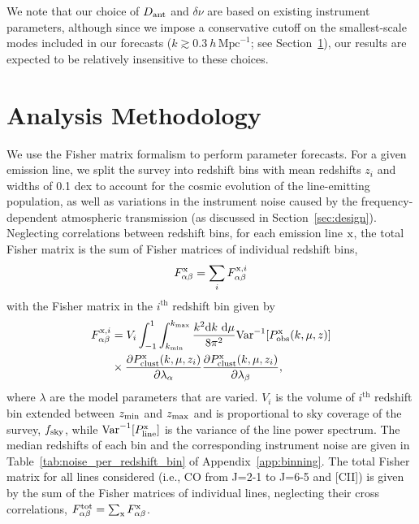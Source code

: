 \documentclass[twocolumn]{aastex631}
\newcommand{\be}{\begin{equation}}
\newcommand{\ee}{\end{equation}}
\begin{document}
We note that our choice of $D_{\rm ant}$ and $\delta\nu$ are based on existing instrument parameters, although since we impose a conservative cutoff on the smallest-scale modes included in our forecasts ($k\gtrsim0.3\ h\,\textrm{Mpc}^{-1}$; see Section~\ref{sec:Fisher}), our results are expected to be relatively insensitive to these choices.  \vspace{-.05in} \\


\section{Analysis Methodology}\label{sec:Fisher}

We use the Fisher matrix formalism to perform parameter forecasts. For a given emission line, we split the survey into redshift bins with mean redshifts $z_i$ and widths of 0.1 dex to account for the cosmic evolution of the line-emitting population, as well as variations in the instrument noise caused by the frequency-dependent atmospheric transmission (as discussed in Section~\ref{sec:design}). Neglecting correlations between redshift bins, for each emission line $\rm x$, the total Fisher matrix is the sum of Fisher matrices of individual redshift bins,
\be
F_{\alpha \beta}^{\rm x} = \sum_i F_{\alpha\beta}^{{\rm x},i}
\ee
with the Fisher matrix in the $i^{\text{th}}$ redshift bin given by
\begin{align}\label{eq:Fisher_single}
F_{\alpha\beta}^{{\rm x},i} &=  V_i \int_{-1}^1\int_{k_{\rm min}}^ {k_{\rm max}}  \frac{ k^2 {\rm d}k \ {\rm d}\mu  }{8 \pi^2} {\rm Var}^{-1}[P_{\rm obs}^{\rm x}(k,\mu,z)] \nonumber \\
&\times \frac{\partial P_{\rm clust}^{\rm x}(k,\mu,z_i)}{\partial { \lambda}_\alpha } \frac{\partial P_{\rm clust}^{\rm x}(k,\mu,z_i)}{\partial {\lambda}_\beta } ,
\end{align}
where $\lambda$ are the model parameters that are varied. $V_i$ is the volume of $i^{\text{th}}$ redshift bin extended between $z_{\rm min}$ and $z_{\rm max}$ and is proportional to sky coverage of the survey, $f_{\rm sky}$, while ${\rm Var}^{-1}[P_{\rm line}^{\rm x}]$ is the variance of the line power spectrum. The median redshifts of each bin and the corresponding instrument noise are given in Table~\ref{tab:noise_per_redshift_bin} of Appendix~\ref{app:binning}. The total Fisher matrix for all lines considered (i.e., CO from  J=2-1  to  J=6-5 and [CII]) is given by the sum of the Fisher matrices of individual lines, neglecting their cross correlations, $F_{\alpha \beta}^{\rm tot} = \sum_{\rm x} F^{\rm x}_{\alpha\beta}$.
\end{document}
